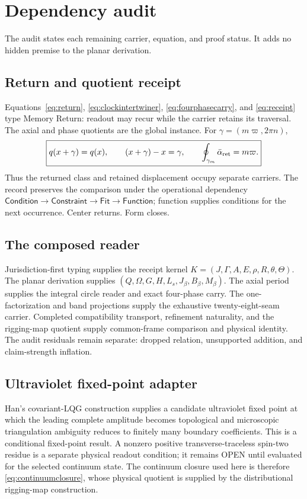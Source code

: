 \documentclass[10pt]{article}
\begin{document}
\section{Dependency audit}\label{app:audit}
The audit states each remaining carrier, equation, and proof status. It adds
no hidden premise to the planar derivation.

\subsection{Return and quotient receipt}\label{app:linear}
Equations~\eqref{eq:return}, \eqref{eq:clockintertwiner},
\eqref{eq:fourphasecarry}, and \eqref{eq:receipt} type Memory Return:
readout may recur while the carrier retains its traversal. The axial and
phase quotients are the global instance. For
$\gamma=(m\varpi,2\pi n)$,
\begin{equation}
\boxed{q(x+\gamma)=q(x),\qquad (x+\gamma)-x=\gamma,\qquad
\oint_{\gamma_m}\bar\alpha_{\rm ret}=m\varpi.}
\end{equation}
Thus the returned class and retained displacement occupy separate carriers.
The record preserves the comparison under the operational dependency
$\mathsf{Condition}\to\mathsf{Constraint}\to\mathsf{Fit}\to\mathsf{Function}$;
function supplies conditions for the next occurrence. Center returns. Form
closes.

\subsection{The composed reader}
Jurisdiction-first typing supplies the receipt kernel
$K=(J,\Gamma,A,E,\rho,R,\theta,\Theta)$. The planar derivation supplies
$(Q,\Omega,G,H,L_s,J_\beta,B_\beta,M_\beta)$. The axial period supplies the
integral circle reader and exact four-phase carry. The one-factorization and
band projections supply the exhaustive twenty-eight-seam carrier. Completed
compatibility transport, refinement naturality, and the rigging-map quotient
supply common-frame comparison and physical identity. The audit residuals
remain separate: dropped relation, unsupported addition, and claim-strength
inflation.

\subsection{Ultraviolet fixed-point adapter}\label{app:uv}
Han's covariant-LQG construction supplies a candidate ultraviolet fixed point
at which the leading complete amplitude becomes topological and microscopic
triangulation ambiguity reduces to finitely many boundary coefficients. This
is a conditional fixed-point result. A nonzero positive transverse-traceless
spin-two residue is a separate physical readout condition; it remains OPEN
until evaluated for the selected continuum state. The continuum closure used
here is therefore \eqref{eq:continuumclosure}, whose physical quotient
is supplied by the distributional rigging-map construction.
\end{document}
